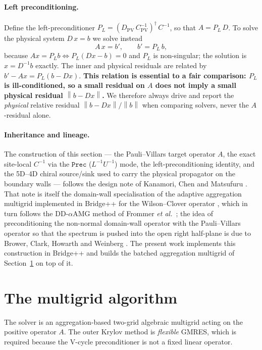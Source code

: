 \documentclass[12pt,a4paper]{article}
\newcommand{\Ddw}{D}
\newcommand{\Dpv}{D_{\mathrm{PV}}}
\newcommand{\Cinv}{C^{-1}}
\newcommand{\Cpvinv}{C_{\mathrm{PV}}^{-1}}
\newcommand{\Aop}{A}
\newcommand{\PL}{P_{L}}
\newcommand{\dg}{^{\dagger}}
\newcommand{\norm}[1]{\left\lVert #1 \right\rVert}
\begin{document}
\paragraph{Left preconditioning.}
Define the left-preconditioner
$\PL = (\Dpv\,\Cpvinv)\dg\,\Cinv$, so that $\Aop = \PL\,\Ddw$. To solve the
physical system $\Ddw\,x = b$ we solve instead
\begin{equation}
\Aop\,x = b', \qquad b' = \PL\,b ,
\label{eq:leftprec}
\end{equation}
because $\Aop x = \PL b \iff \PL(\Ddw x - b)=0$ and $\PL$ is non-singular; the
solution is $x = \Ddw^{-1}b$ exactly. The inner and physical residuals are related
by $b'-\Aop x = \PL(b-\Ddw x)$. \textbf{This relation is essential to a fair
comparison: $\PL$ is ill-conditioned, so a small residual on $\Aop$ does not imply
a small physical residual $\norm{b-\Ddw x}$.} We therefore always drive and report
the \emph{physical} relative residual $\norm{b-\Ddw x}/\norm{b}$ when comparing
solvers, never the $\Aop$-residual alone.

\paragraph{Inheritance and lineage.} The construction of this section --- the
Pauli--Villars target operator $\Aop$, the exact site-local $\Cinv$ via the
$\texttt{Prec}$ ($L^{-1}U^{-1}$) mode, the left-preconditioning identity, and the
5D--4D chiral source/sink used to carry the physical propagator on the boundary
walls --- follows the design note of Kanamori, Chen and Matsufuru \cite{KCM2024}.
That note is itself the domain-wall specialisation of the adaptive aggregation
multigrid implemented in Bridge++ for the Wilson--Clover operator
\cite{BridgeMG}, which in turn follows the DD-$\alpha$AMG method of Frommer
\emph{et al.}\ \cite{DDalphaAMG}; the idea of preconditioning the non-normal
domain-wall operator with the Pauli--Villars operator so that the spectrum is
pushed into the open right half-plane is due to Brower, Clark, Howarth and
Weinberg \cite{BrowerPV}. The present work implements this construction in
Bridge++ and builds the batched aggregation multigrid of
Section~\ref{sec:algorithm} on top of it.

\section{The multigrid algorithm}
\label{sec:algorithm}

The solver is an aggregation-based two-grid algebraic multigrid acting on the
positive operator $\Aop$. The outer Krylov method is \emph{flexible} GMRES, which
is required because the V-cycle preconditioner is not a fixed linear operator.
\end{document}
